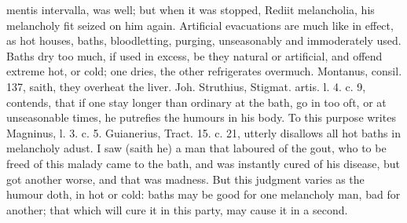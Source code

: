 {mentis intervalla, was well; but when it was stopped, Rediit
melancholia, his melancholy fit seized on him again.
Artificial evacuations are much like in effect, as hot houses, baths,
bloodletting, purging, unseasonably and immoderately used. Baths
dry too much, if used in excess, be they natural or artificial, and
offend extreme hot, or cold; one dries, the other refrigerates
overmuch. Montanus, consil. 137, saith, they overheat the liver. Joh.
Struthius, Stigmat. artis. l. 4. c. 9, contends, that if one stay
longer than ordinary at the bath, go in too oft, or at unseasonable
times, he putrefies the humours in his body. To this purpose writes
Magninus, l. 3. c. 5. Guianerius, Tract. 15. c. 21, utterly disallows
all hot baths in melancholy adust. I saw (saith he) a man that
laboured of the gout, who to be freed of this malady came to the bath,
and was instantly cured of his disease, but got another worse, and that
was madness. But this judgment varies as the humour doth, in hot or
cold: baths may be good for one melancholy man, bad for another; that
which will cure it in this party, may cause it in a second.
}
